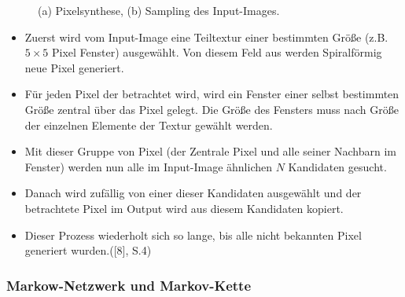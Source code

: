 \documentclass[12pt, a4paper,twoside,openright]{report}
\begin{document}
\begin{figure}[H]
    \centering
    \qquad
    \caption{(a) Pixelsynthese, (b) Sampling des Input-Images.}%
\end{figure}


\begin{itemize}
    \item Zuerst wird vom Input-Image eine Teiltextur einer bestimmten Größe {(z.B. $5\times 5$ Pixel Fenster)} ausgewählt. Von diesem Feld aus werden Spiralförmig neue Pixel generiert.
    \item Für jeden Pixel der betrachtet wird, wird ein Fenster einer selbst bestimmten Größe zentral über das Pixel gelegt.
    Die Größe des Fensters muss nach Größe der einzelnen Elemente der Textur gewählt werden.
    \item Mit dieser Gruppe von Pixel {(der Zentrale Pixel und alle seiner Nachbarn im Fenster)} werden nun alle im Input-Image ähnlichen $N$ Kandidaten gesucht.
    \item Danach wird zufällig von einer dieser Kandidaten ausgewählt und der betrachtete Pixel im Output wird aus diesem Kandidaten kopiert.
    \item Dieser Prozess wiederholt sich so lange, bis alle nicht bekannten Pixel generiert wurden.{([8], S.4)}
\end{itemize}

\subsubsection{Markow-Netzwerk und Markov-Kette}
\end{document}
